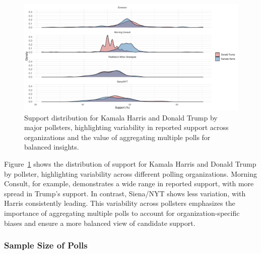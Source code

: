 \documentclass[
  letterpaper,
  DIV=11,
  numbers=noendperiod]{scrartcl}
\begin{document}
\begin{figure}

{\centering \includegraphics{paper_files/figure-pdf/fig-ster-1.pdf}

}

\caption{\label{fig-ster}Support distribution for Kamala Harris and
Donald Trump by major pollsters, highlighting variability in reported
support across organizations and the value of aggregating multiple polls
for balanced insights.}

\end{figure}

Figure~\ref{fig-ster} shows the distribution of support for Kamala
Harris and Donald Trump by pollster, highlighting variability across
different polling organizations. Morning Consult, for example,
demonstrates a wide range in reported support, with more spread in
Trump's support. In contrast, Siena/NYT shows less variation, with
Harris consistently leading. This variability across pollsters
emphasizes the importance of aggregating multiple polls to account for
organization-specific biases and ensure a more balanced view of
candidate support.

\hypertarget{sample-size-of-polls}{%
\subsubsection{Sample Size of Polls}\label{sample-size-of-polls}}

\vspace{0.7cm}
\end{document}
